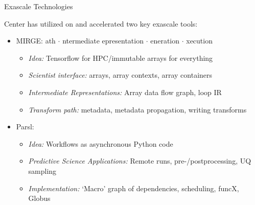 \documentclass[aspectratio=169]{beamer}
\begin{document}
\begin{frame}{Exascale Technologies}
  \begin{center}
    \hspace{1cm}
    \hspace{1cm}
  \end{center}

  Center has utilized on and accelerated two key exascale tools:
\begin{itemize}
\item MIRGE:
    ath $\cdot$
    ntermediate epresentation $\cdot$
    eneration $\cdot$
    xecution
  \begin{itemize}
  \item \emph{Idea:} Tensorflow for HPC/immutable arrays for everything
  \item \emph{Scientist interface:} arrays, array contexts, array containers
  \item \emph{Intermediate Representations:} Array data flow graph, loop IR
  \item \emph{Transform path:} metadata, metadata propagation, writing transforms
  \end{itemize}
\item Parsl:
\begin{itemize}
\item \emph{Idea:} Workflows as asynchronous Python code
\item \emph{Predictive Science Applications:} Remote runs, pre-/postprocessing, UQ sampling
\item \emph{Implementation:} `Macro' graph of dependencies, scheduling, funcX, Globus
\end{itemize}
\end{itemize}
\end{frame}
\end{document}
